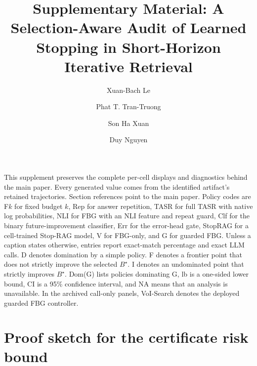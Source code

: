 \documentclass[manuscript,nonacm]{acmart}
\newcommand{\system}{VoI-Search}
\begin{document}
\title[Supplement: Selection-Aware Stopping Audit]{Supplementary Material: A Selection-Aware Audit of Learned Stopping in Short-Horizon Iterative Retrieval}
\author{Xuan-Bach Le}
\author{Phat T. Tran-Truong}
\author{Son Ha Xuan}

\author{Duy Nguyen}

\maketitle

This supplement preserves the complete per-cell displays and diagnostics
behind the main paper. Every generated value comes from the identified
artifact's retained trajectories. Section references point to the main paper.
Policy codes are F$k$ for fixed budget $k$, Rep for answer repetition, TASR for
full TASR with native log probabilities, NLI for FBG with an NLI feature and
repeat guard, Clf for the binary future-improvement classifier, Err for the error-head
gate, StopRAG for a cell-trained Stop-RAG model, V for FBG-only, and G for
guarded FBG. Unless a caption states otherwise, entries report exact-match
percentage and exact LLM calls. D denotes domination by a simple policy. F
denotes a frontier point that does not strictly improve the selected
$B^\star$. I denotes an undominated point that strictly improves $B^\star$.
Dom(G) lists policies dominating G, lb is a one-sided lower bound, CI is a
95\% confidence interval, and NA means that an analysis is unavailable.
In the archived call-only panels, \system{} denotes the deployed guarded FBG
controller.

\section{Proof sketch for the certificate risk bound}
\end{document}
